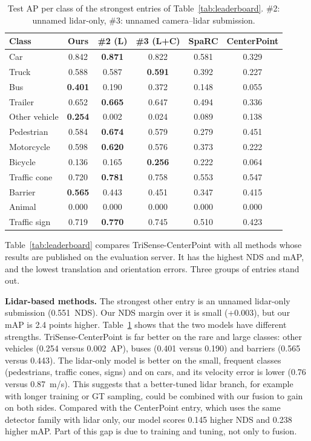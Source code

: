 \documentclass[conference]{IEEEtran}
\newcommand{\method}{TriSense-CenterPoint}
\begin{document}
\begin{table}[t]
\centering
\caption{Test AP per class of the strongest entries of Table~\ref{tab:leaderboard}. \#2: unnamed lidar-only, \#3:
unnamed camera--lidar submission.}
\label{tab:lbclass}
\setlength{\tabcolsep}{3.5pt}
\begin{tabular}{lccccc}
\toprule
Class & Ours & \#2 (L) & \#3 (L+C) & SpaRC & CenterPoint \\
\midrule
Car           & 0.842 & \textbf{0.871} & 0.822 & 0.581 & 0.329 \\
Truck         & 0.588 & 0.587 & \textbf{0.591} & 0.392 & 0.227 \\
Bus           & \textbf{0.401} & 0.190 & 0.372 & 0.148 & 0.055 \\
Trailer       & 0.652 & \textbf{0.665} & 0.647 & 0.494 & 0.336 \\
Other vehicle & \textbf{0.254} & 0.002 & 0.024 & 0.089 & 0.138 \\
Pedestrian    & 0.584 & \textbf{0.674} & 0.579 & 0.279 & 0.451 \\
Motorcycle    & 0.598 & \textbf{0.620} & 0.576 & 0.373 & 0.222 \\
Bicycle       & 0.136 & 0.165 & \textbf{0.256} & 0.222 & 0.064 \\
Traffic cone  & 0.720 & \textbf{0.781} & 0.758 & 0.553 & 0.547 \\
Barrier       & \textbf{0.565} & 0.443 & 0.451 & 0.347 & 0.415 \\
Animal        & 0.000 & 0.000 & 0.000 & 0.000 & 0.000 \\
Traffic sign  & 0.719 & \textbf{0.770} & 0.745 & 0.510 & 0.423 \\
\bottomrule
\end{tabular}
\end{table}

Table~\ref{tab:leaderboard} compares \method{} with all methods whose results are published on the evaluation server.
It has the highest NDS and mAP, and the lowest translation and orientation errors. Three groups of entries
stand out.

\textbf{Lidar-based methods.} The strongest other entry is an unnamed lidar-only submission (0.551~NDS). Our NDS
margin over it is small (+0.003), but our mAP is 2.4 points higher. Table~\ref{tab:lbclass} shows that the two
models have different strengths. \method{} is far better on the rare and large classes: other vehicles
(0.254 versus 0.002~AP), buses (0.401 versus 0.190) and barriers (0.565 versus 0.443). The lidar-only model is better on
the small, frequent classes (pedestrians, traffic cones, signs) and on cars, and its velocity error is lower (0.76
versus 0.87~m/s). This suggests that a better-tuned lidar branch, for example with longer training or GT sampling,
could be combined with our fusion to gain on both sides. Compared with the CenterPoint entry, which uses the same
detector family with lidar only, our model scores 0.145 higher NDS and 0.238 higher mAP. Part of this gap is due to
training and tuning, not only to fusion.
\end{document}
